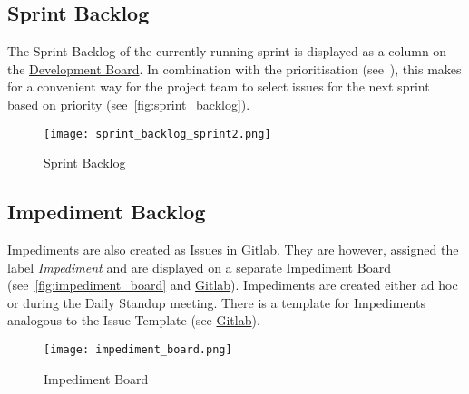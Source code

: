 \subsection{Sprint Backlog}\label{subsec:sprint-backlog}
The Sprint Backlog of the currently running sprint is displayed as a column on the \href{https://gitlab.ti.bfh.ch/decibel-threshold-event-displayer/decibel-threshold-event-displayer/-/boards/2832}{Development Board}.
In combination with the prioritisation (see\ ), this makes for a convenient way for the project team to select issues for the next sprint based on priority (see\ \autoref{fig:sprint_backlog}).
\begin{figure}[H]
    \centering
    \texttt{[image: sprint\_backlog\_sprint2.png]}
    \caption{Sprint Backlog}\label{fig:sprint_backlog}
\end{figure}
\subsection{Impediment Backlog}\label{subsec:impediment_board}
Impediments are also created as Issues in Gitlab.
They are however, assigned the label \textit{Impediment} and are displayed on a separate Impediment Board (see\ \autoref{fig:impediment_board} and \href{https://gitlab.ti.bfh.ch/decibel-threshold-event-displayer/decibel-threshold-event-displayer/-/boards/2834?label_name[]=impediment}{Gitlab}).
Impediments are created either ad hoc or during the Daily Standup meeting.
There is a template for Impediments analogous to the Issue Template (see \href{https://gitlab.ti.bfh.ch/decibel-threshold-event-displayer/decibel-threshold-event-displayer/-/blob/main/.gitlab/issue_templates/Impediment.md}{Gitlab}).
\begin{figure}[H]
    \centering
    \texttt{[image: impediment\_board.png]}
    \caption{Impediment Board}\label{fig:impediment_board}
\end{figure}